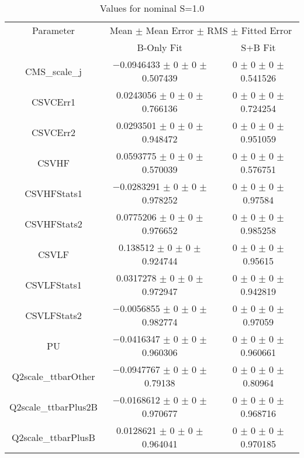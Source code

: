 \begin{table}
\centering
\caption{Values for nominal S=1.0}
\begin{tabular}{ccc}
\toprule
Parameter & \multicolumn{2}{c}{Mean $\pm$ Mean Error $\pm$ RMS $\pm$ Fitted Error}\\
 & B-Only Fit & S+B Fit\\
\midrule
CMS\_scale\_j & \num{-0.0946433} $\pm$ \num{0} $\pm$ \num{0} $\pm$ \num{0.507439} & \num{0} $\pm$ \num{0} $\pm$ \num{0} $\pm$ \num{0.541526}\\
CSVCErr1 & \num{0.0243056} $\pm$ \num{0} $\pm$ \num{0} $\pm$ \num{0.766136} & \num{0} $\pm$ \num{0} $\pm$ \num{0} $\pm$ \num{0.724254}\\
CSVCErr2 & \num{0.0293501} $\pm$ \num{0} $\pm$ \num{0} $\pm$ \num{0.948472} & \num{0} $\pm$ \num{0} $\pm$ \num{0} $\pm$ \num{0.951059}\\
CSVHF & \num{0.0593775} $\pm$ \num{0} $\pm$ \num{0} $\pm$ \num{0.570039} & \num{0} $\pm$ \num{0} $\pm$ \num{0} $\pm$ \num{0.576751}\\
CSVHFStats1 & \num{-0.0283291} $\pm$ \num{0} $\pm$ \num{0} $\pm$ \num{0.978252} & \num{0} $\pm$ \num{0} $\pm$ \num{0} $\pm$ \num{0.97584}\\
CSVHFStats2 & \num{0.0775206} $\pm$ \num{0} $\pm$ \num{0} $\pm$ \num{0.976652} & \num{0} $\pm$ \num{0} $\pm$ \num{0} $\pm$ \num{0.985258}\\
CSVLF & \num{0.138512} $\pm$ \num{0} $\pm$ \num{0} $\pm$ \num{0.924744} & \num{0} $\pm$ \num{0} $\pm$ \num{0} $\pm$ \num{0.95615}\\
CSVLFStats1 & \num{0.0317278} $\pm$ \num{0} $\pm$ \num{0} $\pm$ \num{0.972947} & \num{0} $\pm$ \num{0} $\pm$ \num{0} $\pm$ \num{0.942819}\\
CSVLFStats2 & \num{-0.0056855} $\pm$ \num{0} $\pm$ \num{0} $\pm$ \num{0.982774} & \num{0} $\pm$ \num{0} $\pm$ \num{0} $\pm$ \num{0.97059}\\
PU & \num{-0.0416347} $\pm$ \num{0} $\pm$ \num{0} $\pm$ \num{0.960306} & \num{0} $\pm$ \num{0} $\pm$ \num{0} $\pm$ \num{0.960661}\\
Q2scale\_ttbarOther & \num{-0.0947767} $\pm$ \num{0} $\pm$ \num{0} $\pm$ \num{0.79138} & \num{0} $\pm$ \num{0} $\pm$ \num{0} $\pm$ \num{0.80964}\\
Q2scale\_ttbarPlus2B & \num{-0.0168612} $\pm$ \num{0} $\pm$ \num{0} $\pm$ \num{0.970677} & \num{0} $\pm$ \num{0} $\pm$ \num{0} $\pm$ \num{0.968716}\\
Q2scale\_ttbarPlusB & \num{0.0128621} $\pm$ \num{0} $\pm$ \num{0} $\pm$ \num{0.964041} & \num{0} $\pm$ \num{0} $\pm$ \num{0} $\pm$ \num{0.970185}\\

\end{tabular}
\end{table}

